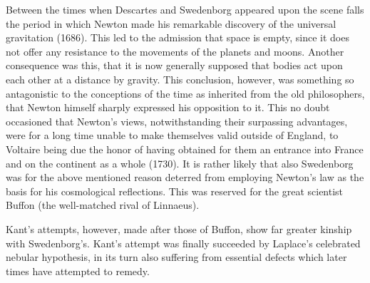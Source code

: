 \documentclass[a4paper, 11pt, oneside, polutonikogreek, english]{article}
\begin{document}
Between the times when Descartes and Swedenborg appeared upon the scene falls the period in which Newton made his remarkable discovery of the universal gravitation (1686). This led to the admission that space is empty, since it does not offer any resistance to the movements of the planets and moons. Another consequence was this, that it is now generally supposed that bodies act upon each other at a distance by gravity. This conclusion, however, was something so antagonistic to the conceptions of the time as inherited from the old philosophers, that Newton himself sharply expressed his opposition to it. This no doubt occasioned that Newton's views, notwithstanding their surpassing advantages, were for a long time unable to make themselves valid outside of England, to Voltaire being due the honor of having obtained for them an entrance into France and on the continent as a whole (1730). It is rather likely that also Swedenborg was for the above mentioned reason deterred from employing Newton's law as the basis for his cosmological reflections. This was reserved for the great scientist Buffon (the well-matched rival of Linnaeus).

Kant's attempts, however, made after those of Buffon, show far greater kinship with Swedenborg's. Kant's attempt was finally succeeded by Laplace's celebrated nebular hypothesis, in its turn also suffering from essential defects which later times have attempted to remedy.
\end{document}
